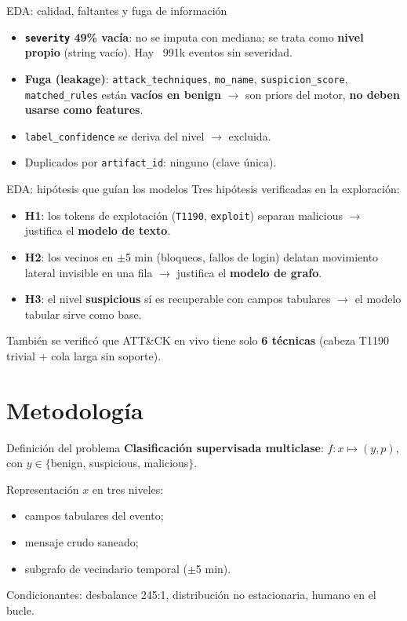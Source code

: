 \documentclass[aspectratio=169,10pt]{beamer}
\begin{document}
\begin{frame}{EDA: calidad, faltantes y fuga de información}
\begin{itemize}
\item \textbf{\texttt{severity} 49\% vacía}: no se imputa con mediana; se trata como \textbf{nivel propio} (string vacío). Hay ~991k eventos sin severidad.
\item \textbf{Fuga (leakage)}: \texttt{attack\_techniques}, \texttt{mo\_name}, \texttt{suspicion\_score}, \texttt{matched\_rules} están \textbf{vacíos en benign} $\to$ son priors del motor, \textbf{no deben usarse como features}.
\item \texttt{label\_confidence} se deriva del nivel $\to$ excluida.
\item Duplicados por \texttt{artifact\_id}: ninguno (clave única).
\end{itemize}
\end{frame}

\begin{frame}{EDA: hipótesis que guían los modelos}
Tres hipótesis verificadas en la exploración:

\begin{itemize}
\item \textbf{H1}: los tokens de explotación (\texttt{T1190}, \texttt{exploit}) separan malicious $\to$ justifica el \textbf{modelo de texto}.
\item \textbf{H2}: los vecinos en $\pm$5 min (bloqueos, fallos de login) delatan movimiento lateral invisible en una fila $\to$ justifica el \textbf{modelo de grafo}.
\item \textbf{H3}: el nivel \textbf{suspicious} sí es recuperable con campos tabulares $\to$ el modelo tabular sirve como base.
\end{itemize}

Tambi\'en se verific\'o que ATT\&CK en vivo tiene solo \textbf{6 técnicas} (cabeza T1190 trivial + cola larga sin soporte).
\end{frame}

\section{Metodología}
\begin{frame}{Definición del problema}
\textbf{Clasificación supervisada multiclase}: $f: x \mapsto (y, p)$, con $y \in \{$benign, suspicious, malicious$\}$.

Representación $x$ en tres niveles:
\begin{itemize}
\item campos tabulares del evento;
\item mensaje crudo saneado;
\item subgrafo de vecindario temporal ($\pm$5 min).
\end{itemize}
Condicionantes: desbalance 245:1, distribución no estacionaria, humano en el bucle.
\end{frame}
\end{document}
